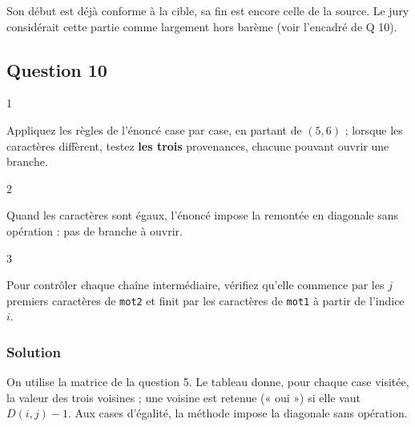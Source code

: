 \documentclass[11pt,a4paper]{article}
\newcommand{\equationajustee}[1]{%
  \sbox{\boiteequation}{$\displaystyle #1$}%
  \ifdim\wd\boiteequation>\linewidth
    \[\resizebox{\linewidth}{!}{\usebox{\boiteequation}}\]%
  \else
    \[#1\]%
  \fi}
\begin{document}
\equationajustee{\texttt{mot}(i,j)=\texttt{mot2[:j]}+\texttt{mot1[i:]}}

Son début est déjà conforme à la cible, sa fin est encore celle de la source. Le jury considérait cette partie comme largement hors barème (voir l'encadré de Q 10).

\hypertarget{question-10}{%
\subsection{Question 10}\label{question-10}}

\begin{indication}{1}

Appliquez les règles de l'énoncé case par case, en partant de \((5,6)\) ; lorsque les caractères diffèrent, testez \textbf{les trois} provenances, chacune pouvant ouvrir une branche.

\end{indication}

\begin{indication}{2}

Quand les caractères sont égaux, l'énoncé impose la remontée en diagonale sans opération : pas de branche à ouvrir.

\end{indication}

\begin{indication}{3}

Pour contrôler chaque chaîne intermédiaire, vérifiez qu'elle commence par les \(j\) premiers caractères de \texttt{mot2} et finit par les caractères de \texttt{mot1} à partir de l'indice \(i\).

\end{indication}

\hypertarget{solution-12}{%
\subsubsection{Solution}\label{solution-12}}

On utilise la matrice de la question 5. Le tableau donne, pour chaque case visitée, la valeur des trois voisines ; une voisine est retenue (« oui ») si elle vaut \(D(i,j)-1\). Aux cases d'égalité, la méthode impose la diagonale sans opération.
\end{document}
